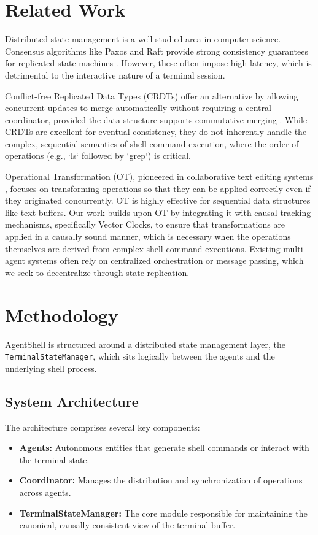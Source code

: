 \documentclass[11pt,a4paper]{article}
\begin{document}
\section{Related Work}
Distributed state management is a well-studied area in computer science. Consensus algorithms like Paxos and Raft provide strong consistency guarantees for replicated state machines \cite{raft2014}. However, these often impose high latency, which is detrimental to the interactive nature of a terminal session.

Conflict-free Replicated Data Types (CRDTs) offer an alternative by allowing concurrent updates to merge automatically without requiring a central coordinator, provided the data structure supports commutative merging \cite{adams2017}. While CRDTs are excellent for eventual consistency, they do not inherently handle the complex, sequential semantics of shell command execution, where the order of operations (e.g., `ls` followed by `grep`) is critical.

Operational Transformation (OT), pioneered in collaborative text editing systems \cite{lamport1978}, focuses on transforming operations so that they can be applied correctly even if they originated concurrently. OT is highly effective for sequential data structures like text buffers. Our work builds upon OT by integrating it with causal tracking mechanisms, specifically Vector Clocks, to ensure that transformations are applied in a causally sound manner, which is necessary when the operations themselves are derived from complex shell command executions. Existing multi-agent systems often rely on centralized orchestration or message passing, which we seek to decentralize through state replication.

\section{Methodology}
AgentShell is structured around a distributed state management layer, the \texttt{TerminalStateManager}, which sits logically between the agents and the underlying shell process.

\subsection{System Architecture}
The architecture comprises several key components:
\begin{itemize}
    \item \textbf{Agents:} Autonomous entities that generate shell commands or interact with the terminal state.
    \item \textbf{Coordinator:} Manages the distribution and synchronization of operations across agents.
    \item \textbf{TerminalStateManager:} The core module responsible for maintaining the canonical, causally-consistent view of the terminal buffer.
\end{itemize}
\end{document}
